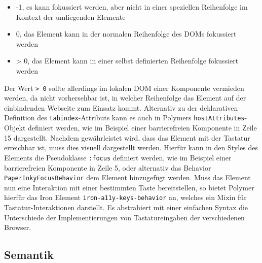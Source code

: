 \begin{itemize}
\item
  -1, es kann fokussiert werden, aber nicht in einer speziellen
  Reihenfolge im Kontext der umliegenden Elemente
\item
  0, das Element kann in der normalen Reihenfolge des \ac{DOM}s fokussiert
  werden
\item
  \textgreater{} 0, das Element kann in einer selbst definierten Reihenfolge fokussiert
  werden
\end{itemize}

Der Wert \texttt{\textgreater{}\ 0} sollte allerdings im lokalen \ac{DOM} einer Komponente vermieden werden, da nicht vorhersehbar ist, in welcher Reihenfolge das Element auf der einbindenden Webseite zum Einsatz kommt. Alternativ zu der deklarativen Definition des \texttt{tabindex}-Attributs kann es auch in Polymers \texttt{hostAttributes}-Objekt definiert werden, wie im Beispiel einer barrierefreien Komponente in Zeile 15 dargestellt. Nachdem gewährleistet wird, dass das Element mit der Tastatur erreichbar ist, muss dies visuell dargestellt werden. Hierfür kann in den Styles des Elements die Pseudoklasse \texttt{:focus} definiert werden, wie im Beispiel einer barrierefreien Komponente in Zeile 5, oder alternativ das Behavior \texttt{PaperInkyFocusBehavior} dem Element hinzugefügt werden. Muss das Element nun eine Interaktion mit einer bestimmten Taste bereitstellen, so bietet Polymer hierfür das Iron Element \texttt{iron-a11y-keys-behavior} an, welches ein Mixin für Tastatur-Interaktionen darstellt. Es abstrahiert mit einer einfachen Syntax die Unterschiede der Implementierungen von Tastatureingaben der verschiedenen Browser.


\subsection{Semantik}\label{semantik}

